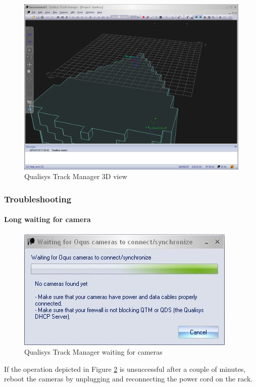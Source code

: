 \documentclass[a4paper,english]{report}
\begin{document}
\begin{enumerate}
\begin{figure}[!h]
		\centering \includegraphics[width=1\textwidth]{fig/qualisys_3d} \caption{\label{fig:Qualisys-Track-Managerr3D}Qualisys Track Manager 3D view}
	\end{figure}
\end{enumerate}

\subsubsection*{Troubleshooting}
\paragraph*{Long waiting for camera}
\begin{figure}[htb!]
	\centering 
	\includegraphics[scale=0.45]{fig/qualisys_waiting_to_connect}
	\caption{Qualisys Track Manager waiting for cameras}
	\label{fig:Qualisys-Track-ManagerWaiting}
\end{figure}
If the operation depicted in Figure \ref{fig:Qualisys-Track-ManagerWaiting} is unsuccessful after a couple of minutes, reboot the cameras by unplugging and reconnecting the power cord on the rack.
\end{document}
